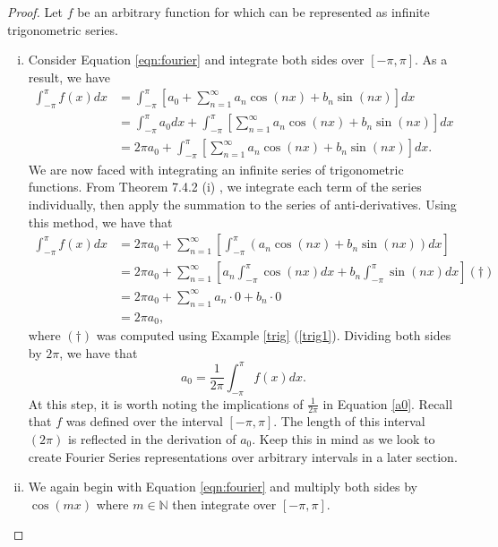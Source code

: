 \documentclass[11pt]{amsart}
\theoremstyle{plain}
\theoremstyle{definition}
\newcommand{\N}{\mathbb N}
\begin{document}
\begin{proof}
	Let $f$ be an arbitrary function for which can be represented as infinite trigonometric series. 
    \begin{enumerate}[(i)]
    \item Consider Equation \ref{eqn:fourier} and integrate both sides over $[-\pi, \pi]$. As a result, we have
    \begin{align*}
        \int_{-\pi}^{\pi} f(x) dx &= \int_{-\pi}^{\pi} \left[ a_0 + \sum_{n=1}^\infty a_n\cos(nx) + b_n\sin(nx)\right]dx\\
        &= \int_{-\pi}^{\pi}a_0 dx + \int_{-\pi}^{\pi} \left[\sum_{n=1}^\infty a_n\cos(nx) + b_n\sin(nx)\right]dx\\
        &= 2\pi a_0 + \int_{-\pi}^{\pi} \left[\sum_{n=1}^\infty a_n\cos(nx) + b_n\sin(nx)\right]dx.
    \end{align*}
    We are now faced with integrating an infinite series of trigonometric functions. From Theorem 7.4.2 (i) \cite{Abbott}, we integrate each term of the series individually, then apply the summation to the series of anti-derivatives. Using this method, we have that
    \begin{align*}
        \int_{-\pi}^{\pi} f(x) dx &= 2\pi a_0 + \sum_{n=1}^\infty\left[\int_{-\pi}^{\pi}\left(a_n\cos (nx) + b_n\sin(nx)\right)dx\right]\\
        &= 2\pi a_0 + \sum_{n=1}^\infty\left[a_n\int_{-\pi}^{\pi}\cos (nx)dx + b_n\int_{-\pi}^{\pi}\sin(nx)dx\right](\dagger)\\
        &= 2\pi a_0 + \sum_{n=1}^\infty a_n\cdot0 + b_n\cdot0\\
        &= 2\pi a_0,
    \end{align*}
    where $(\dagger)$ was computed using Example \ref{trig} (\ref{trig1}). Dividing both sides by $2\pi$, we have that
    \begin{equation}
        \label{a0}
        a_0 =\dfrac{1}{2\pi}\int_{-\pi}^{\pi}f(x)dx.
    \end{equation}
    At this step, it is worth noting the implications of $\frac{1}{2\pi}$ in Equation \ref{a0}. Recall that $f$ was defined over the interval $[-\pi,\pi]$. The length of this interval $(2\pi)$ is reflected in the derivation of $a_0$. Keep this in mind as we look to create Fourier Series representations over arbitrary intervals in a later section.
    \label{fourier1}
    \item We again begin with Equation \ref{eqn:fourier} and multiply both sides by $\cos(mx)$ where $m\in\N$ then integrate over $[-\pi,\pi]$.

\end{enumerate}
\end{proof}
\end{document}
